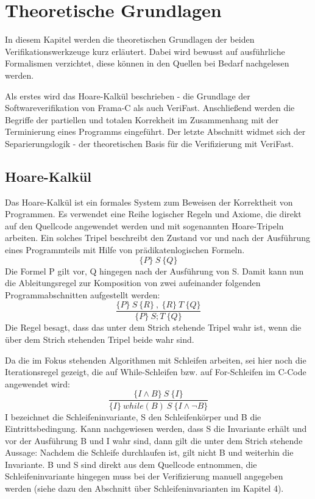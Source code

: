 ﻿
\chapter{Theoretische Grundlagen}

In diesem Kapitel werden die theoretischen Grundlagen der beiden Verifikationswerkzeuge kurz erläutert. Dabei wird bewusst
auf ausführliche Formalismen verzichtet, diese können in den Quellen bei Bedarf nachgelesen werden.

Als erstes wird das Hoare-Kalkül beschrieben - die Grundlage der Softwareverifikation von Frama-C als auch VeriFast.
Anschließend werden die Begriffe der partiellen und totalen Korrekheit im Zusammenhang mit der Terminierung eines Programms
eingeführt. Der letzte Abschnitt widmet sich der Separierungslogik - der theoretischen Basis für die Verifizierung
mit VeriFast.

\section{Hoare-Kalkül}

Das Hoare-Kalkül ist ein formales System zum Beweisen der Korrektheit von Programmen. Es verwendet eine Reihe logischer
Regeln und Axiome, die direkt auf den Quellcode angewendet werden und mit sogenannten Hoare-Tripeln arbeiten. Ein solches
Tripel beschreibt den Zustand vor und nach der Ausführung eines Programmteils mit Hilfe von prädikatenlogischen
Formeln.
\begin{displaymath}
\{P\} \: S \: \{Q\}
\end{displaymath}
Die Formel P gilt vor, Q hingegen nach der Ausführung von S. Damit kann nun die Ableitungsregel zur Komposition von
zwei aufeinander folgenden Programmabschnitten aufgestellt werden:
\begin{displaymath}
\frac{\{P\} \:S\: \{R\} \:, \: \{R\} \: T \: \{Q\}}{\{P\}\: S; T \: \{Q\}}
\end{displaymath}
Die Regel besagt, dass das unter dem Strich stehende Tripel wahr ist, wenn die über dem Strich
stehenden Tripel beide wahr sind.

Da die im Fokus stehenden Algorithmen mit Schleifen arbeiten, sei hier noch die Iterationsregel gezeigt, die auf While-Schleifen
bzw. auf For-Schleifen im C-Code angewendet wird: 
\begin{displaymath}
\frac{\{I \land B\} \:S\: \{I\}}{\{I\}\: while(B)\: S\: \{I \land \neg B\}}
\end{displaymath}
I bezeichnet die Schleifeninvariante, S den Schleifenkörper und B die Eintrittsbedingung. Kann nachgewiesen werden,
dass S die Invariante erhält und vor der Ausführung B und I wahr sind, dann gilt die unter dem Strich stehende Aussage: Nachdem
die Schleife durchlaufen ist, gilt nicht B und weiterhin die Invariante. B und S sind direkt aus dem Quellcode entnommen, 
die Schleifeninvariante hingegen muss bei der Verifizierung  manuell angegeben werden (siehe dazu den Abschnitt über 
Schleifeninvarianten im Kapitel 4).

